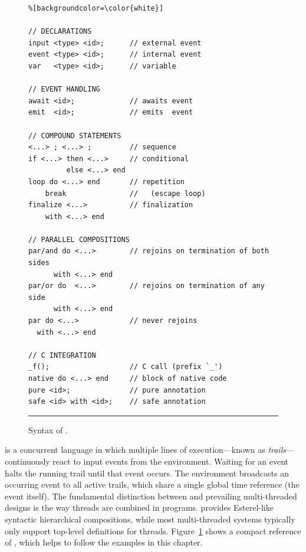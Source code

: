 
\begin{figure}[t]
\begin{lstlisting}%[backgroundcolor=\color{white}]

// DECLARATIONS
input <type> <id>;      // external event
event <type> <id>;      // internal event
var   <type> <id>;      // variable

// EVENT HANDLING
await <id>;             // awaits event
emit  <id>;             // emits  event

// COMPOUND STATEMENTS
<...> ; <...> ;         // sequence
if <...> then <...>     // conditional
         else <...> end
loop do <...> end       // repetition
    break               //   (escape loop)
finalize <...>          // finalization
    with <...> end

// PARALLEL COMPOSITIONS
par/and do <...>        // rejoins on termination of both sides
      with <...> end
par/or do  <...>        // rejoins on termination of any side
      with <...> end
par do <...>            // never rejoins
  with <...> end

// C INTEGRATION
_f();                   // C call (prefix `_')
native do <...> end     // block of native code
pure <id>;              // pure annotation
safe <id> with <id>;    // safe annotation
\end{lstlisting}
\rule{14cm}{0.37pt}
\caption{ Syntax of \CEU.\newline
{\small %
}%
\label{lst.syntax}
}
\end{figure}

\CEU is a concurrent language in which multiple lines of execution---known as 
\emph{trails}---continuously react to input events from the environment.
Waiting for an event halts the running trail until that event occurs.
The environment broadcasts an occurring event to all active trails, which share 
a single global time reference (the event itself).
%
%
The fundamental distinction between \CEU and prevailing multi-threaded designs 
is the way threads are combined in programs.
\CEU provides Esterel-like syntactic hierarchical compositions, while most 
multi-threaded systems typically only support top-level definitions for 
threads.
Figure~\ref{lst.syntax} shows a compact reference of \CEU, which helps to 
follow the examples in this chapter.

